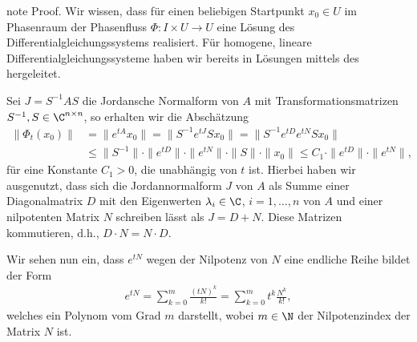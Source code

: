 \documentclass[letterpaper,10pt,german]{jupyterBook}
\begin{document}
\begin{sphinxadmonition}{note}
\sphinxAtStartPar
Proof. Wir wissen, dass für einen beliebigen Startpunkt \(x_0 \in U\) im Phasenraum der Phasenfluss \(\Phi \colon I \times U \rightarrow U\) eine Lösung des Differentialgleichungssystems realisiert.
Für homogene, lineare Differentialgleichungssysteme haben wir bereits in {\hyperref[\detokenize{ode/repetition:s-lineare-dglsysteme}]{}} Lösungen mittels des  hergeleitet.

\sphinxAtStartPar
Sei \(J = S^{-1}AS\) die Jordansche Normalform von \(A\) mit Transformationsmatrizen \(S^{-1},S \in \C^{n \times n}\), so erhalten wir die Abschätzung
\begin{equation*}
\begin{split}\|\Phi_t(x_0)\| &= \|e^{tA}x_0\| = \|S^{-1}e^{tJ}Sx_0\| = \|S^{-1}e^{tD}e^{tN}Sx_0\| \\
&\leq \|S^{-1}\| \cdot \|e^{tD}\| \cdot \|e^{tN}\| \cdot \|S\| \cdot \|x_0\| \leq C_1 \cdot \|e^{tD}\| \cdot \|e^{t N}\|,\end{split}
\end{equation*}
\sphinxAtStartPar
für eine Konstante \(C_1 > 0\), die unabhängig von \(t\) ist.
Hierbei haben wir ausgenutzt, dass sich die Jordannormalform \(J\) von \(A\) als Summe einer Diagonalmatrix \(D\) mit den Eigenwerten \(\lambda_i \in \C\), \(i=1,\ldots,n\) von \(A\) und einer nilpotenten Matrix \(N\) schreiben lässt als \(J = D + N\).
Diese Matrizen kommutieren, d.h., \(D \cdot N = N \cdot D\).

\sphinxAtStartPar
Wir sehen nun ein, dass \(e^{tN}\) wegen der Nilpotenz von \(N\) eine endliche Reihe bildet der Form
\begin{equation*}
\begin{split}e^{tN} = \sum_{k=0}^m \frac{(tN)^k}{k!} = \sum_{k=0}^m t^k\frac{N^k}{k!},\end{split}
\end{equation*}
\sphinxAtStartPar
welches ein Polynom vom Grad \(m\) darstellt, wobei \(m \in \N\) der Nilpotenzindex der Matrix \(N\) ist.


\end{sphinxadmonition}
\end{document}
